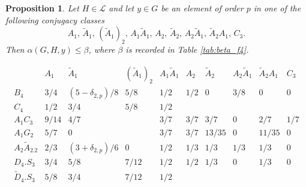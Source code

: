 \documentclass[twoside,a4paper,reqno,11pt]{amsart}
\renewcommand{\a}{\alpha}
\renewcommand{\b}{\beta}
\newcommand{\<}{\langle}
\renewcommand{\>}{\rangle}
\newcommand{\leqs}{\leqslant}
\renewcommand{\:}{\colon}
\theoremstyle{plain}
\newtheorem{prop}[thm]{Proposition}
\theoremstyle{definition}
\begin{document}
\begin{prop}\label{p:f4_dim3}
Let $H \in \mathcal{L}$ and let $y \in G$ be an element of order $p$ in one of the following conjugacy classes
\[
A_1, \, \tilde{A}_1, \, (\tilde{A}_1)_2, \, A_1\tilde{A}_1, \, A_2, \, \tilde{A}_2, \, A_2\tilde{A}_1, \, \tilde{A}_2A_1, \, C_3. 
\]
Then $\a(G,H,y) \leqs \b$, where $\b$ is recorded in Table \ref{tab:beta_f4}.
\end{prop}

{\small
\begin{table}
\[
\begin{array}{l|ccccccccc}
& A_1 & \tilde{A}_1 & (\tilde{A}_1)_2 & A_1\tilde{A}_1 & A_2 & \tilde{A}_2 & A_2\tilde{A}_1 & \tilde{A}_2A_1 & C_3 \\ \hline
B_4 & 3/4 & (5-\delta_{2,p})/8 & 5/8 & 1/2 & 1/2 & 0 & 3/8 & 0 & 0 \\
C_4 & 1/2 & 3/4 & 5/8 & 1/2 &  &  &  &  &  \\
A_1C_3 & 9/14 & 4/7 & & 3/7 & 3/7 & 3/7 & 0 & 2/7 & 1/7 \\
A_1G_2 & 5/7 & 0 & & 3/7 & 3/7 & 13/35 & 0 & 11/35 &  0 \\
A_2\tilde{A}_2.2 & 2/3 & (3+\delta_{2,p})/6 & 0 & 1/2 & 1/3 & 1/3 & 1/3 & 1/3 &  0 \\ 
D_4.S_3 & 3/4 & 5/8 & 7/12 & 1/2 & 1/2 & 1/3 & 0 & 1/3 &  0 \\
\tilde{D}_4.S_3 & 5/8 & 3/4 & 7/12 & 1/2 & & & & &  \\
\end{array}
\]
\caption{The upper bound $\a(G,H,y) \leqs \b$ in Proposition \ref{p:f4_dim3}}
\label{tab:beta_f4}
\end{table}}
\end{document}

